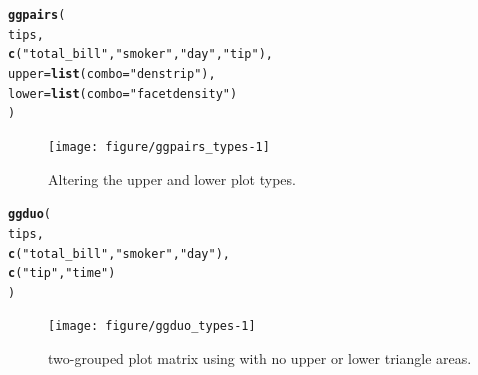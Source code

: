\documentclass[stat,dissertation]{puthesis}\usepackage[]{graphicx}\usepackage{xcolor}
\makeatletter
\newcommand{\hlstr}[1]{\textcolor[rgb]{0.192,0.494,0.8}{#1}}%
\newcommand{\hlstd}[1]{\textcolor[rgb]{0.345,0.345,0.345}{#1}}%
\newcommand{\hlkwc}[1]{\textcolor[rgb]{0.333,0.667,0.333}{#1}}%
\newcommand{\hlkwd}[1]{\textcolor[rgb]{0.737,0.353,0.396}{\textbf{#1}}}%
\newenvironment{kframe}{%
 \def\at@end@of@kframe{}%
 \ifinner\ifhmode%
  \def\at@end@of@kframe{\end{minipage}}%
  \begin{minipage}{\columnwidth}%
 \fi\fi%
 \def\FrameCommand##1{\hskip\@totalleftmargin \hskip-\fboxsep
 \colorbox{shadecolor}{##1}\hskip-\fboxsep
     \hskip-\linewidth \hskip-\@totalleftmargin \hskip\columnwidth}%
 \MakeFramed {\advance\hsize-\width
   \@totalleftmargin\z@ \linewidth\hsize
   \@setminipage}}%
 {\par\unskip\endMakeFramed%
 \at@end@of@kframe}
\newenvironment{knitrout}{}{} %
\renewenvironment{knitrout}{\setstretch{1}}{}
\makeatother
\begin{document}
\newpage
\begin{knitrout}\small
{}\color{fgcolor}\begin{kframe}
\begin{alltt}
\hlkwd{ggpairs}\hlstd{(}
  \hlstd{tips,}
  \hlkwd{c}\hlstd{(}\hlstr{"total_bill"}\hlstd{,} \hlstr{"smoker"}\hlstd{,} \hlstr{"day"}\hlstd{,} \hlstr{"tip"}\hlstd{),}
  \hlkwc{upper} \hlstd{=} \hlkwd{list}\hlstd{(}\hlkwc{combo} \hlstd{=} \hlstr{"denstrip"}\hlstd{),}
  \hlkwc{lower} \hlstd{=} \hlkwd{list}\hlstd{(}\hlkwc{combo} \hlstd{=} \hlstr{"facetdensity"}\hlstd{)}
\hlstd{)}
\end{alltt}
\end{kframe}\begin{figure}[H]

{\centering \texttt{[image: figure/ggpairs\_types-1]} 

}

\caption{Altering the  upper and lower  plot types.}\label{fig:ggpairs_types}
\end{figure}


\end{knitrout}

\newpage
\begin{knitrout}\small
{}\color{fgcolor}\begin{kframe}
\begin{alltt}
\hlkwd{ggduo}\hlstd{(}
  \hlstd{tips,}
  \hlkwd{c}\hlstd{(}\hlstr{"total_bill"}\hlstd{,} \hlstr{"smoker"}\hlstd{,} \hlstr{"day"}\hlstd{),}
  \hlkwd{c}\hlstd{(}\hlstr{"tip"}\hlstd{,} \hlstr{"time"}\hlstd{)}
\hlstd{)}
\end{alltt}
\end{kframe}\begin{figure}[H]

{\centering \texttt{[image: figure/ggduo\_types-1]} 

}

\caption{two-grouped plot matrix using  with no upper or lower triangle areas.}\label{fig:ggduo_types}
\end{figure}


\end{knitrout}
\end{document}
